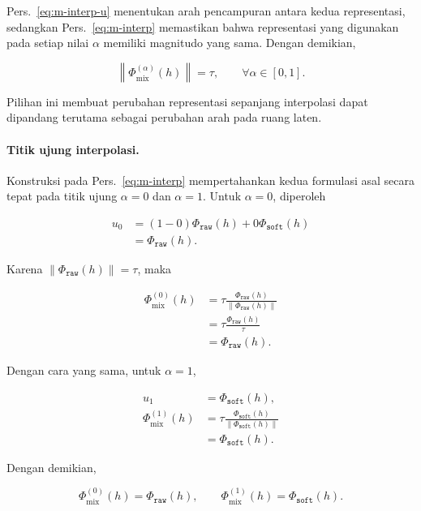 Pers.~\eqref{eq:m-interp-u} menentukan arah pencampuran antara kedua
representasi, sedangkan Pers.~\eqref{eq:m-interp} memastikan bahwa representasi
yang digunakan pada setiap nilai $\alpha$ memiliki magnitudo yang sama.
Dengan demikian,

\begin{equation}
\left\lVert
\Phi_{\mathrm{mix}}^{(\alpha)}(h)
\right\rVert
=
\tau,
\qquad
\forall\alpha\in[0,1].
\label{eq:m-interp-norm}
\end{equation}

Pilihan ini membuat perubahan representasi sepanjang interpolasi dapat
dipandang terutama sebagai perubahan arah pada ruang laten.

\paragraph{Titik ujung interpolasi.}

Konstruksi pada Pers.~\eqref{eq:m-interp} mempertahankan kedua formulasi asal
secara tepat pada titik ujung $\alpha=0$ dan $\alpha=1$. Untuk $\alpha=0$,
diperoleh

\begin{align}
u_0
&=
(1-0)\Phi_{\texttt{raw}}(h)
+
0\Phi_{\texttt{soft}}(h)
\nonumber\\
&=
\Phi_{\texttt{raw}}(h).
\end{align}

Karena $\lVert\Phi_{\texttt{raw}}(h)\rVert=\tau$, maka

\begin{align}
\Phi_{\mathrm{mix}}^{(0)}(h)
&=
\tau
\frac{\Phi_{\texttt{raw}}(h)}
{\lVert\Phi_{\texttt{raw}}(h)\rVert}
\nonumber\\
&=
\tau
\frac{\Phi_{\texttt{raw}}(h)}
{\tau}
\nonumber\\
&=
\Phi_{\texttt{raw}}(h).
\label{eq:m-interp-end-raw}
\end{align}

Dengan cara yang sama, untuk $\alpha=1$,

\begin{align}
u_1
&=
\Phi_{\texttt{soft}}(h),
\\
\Phi_{\mathrm{mix}}^{(1)}(h)
&=
\tau
\frac{\Phi_{\texttt{soft}}(h)}
{\lVert\Phi_{\texttt{soft}}(h)\rVert}
\nonumber\\
&=
\Phi_{\texttt{soft}}(h).
\label{eq:m-interp-end-soft}
\end{align}

Dengan demikian,

\begin{equation}
\boxed{
\Phi_{\mathrm{mix}}^{(0)}(h)
=
\Phi_{\texttt{raw}}(h),
\qquad
\Phi_{\mathrm{mix}}^{(1)}(h)
=
\Phi_{\texttt{soft}}(h)
}.
\label{eq:m-interp-endpoints}
\end{equation}

